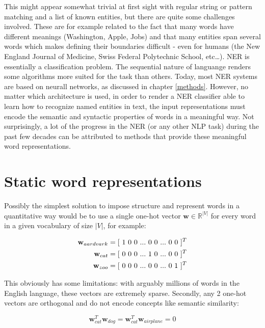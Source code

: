 \documentclass[12pt,a4paper,]{book}
\begin{document}
This might appear somewhat trivial at first sight with regular string or pattern matching and a list of known entities, but there are quite some challenges involved. These are for example related to the fact that many words have different meanings (Washington, Apple, Jobs) and that many entities span several words which makes defining their boundaries difficult - even for humans (the New England Journal of Medicine, Swiss Federal Polytechnic School, etc\ldots{}). NER is essentially a classification problem. The sequential nature of languange renders some algorithms more suited for the task than others. Today, most NER systems are based on neurall networks, as discussed in chapter \ref{methods}. However, no matter which architecture is used, in order to render a NER classifier able to learn how to recognize named entities in text, the input representations must encode the semantic and syntactic properties of words in a meaningful way. Not surprisingly, a lot of the progress in the NER (or any other NLP task) during the past few decades can be attributed to methods that provide these meaningful word representations.

\hypertarget{static-word-representations}{%
\section{Static word representations}\label{static-word-representations}}

Possibly the simplest solution to impose structure and represent words in a quantitative way would be to use a single one-hot vector \(\mathbf{w} \in \mathbb{R}^{|V|}\) for every word in a given vocabulary of size \(|V|\), for example:

\begin{align}
\mathbf{w}_{aardvark} = [\ 1\ 0\ 0\ ...\ 0\ 0\ ...\ 0\ 0\ ]^T \notag \\
\mathbf{w}_{cat} = [\ 0\ 0\ 0\ ...\ 1\ 0\ ...\ 0\ 0\ ]^T \notag \\
\mathbf{w}_{zoo} = [\ 0\ 0\ 0\ ...\ 0\ 0\ ...\ 0\ 1\ ]^T \notag 
\end{align}

This obviously has some limitations: with arguably millions of words in the English language, these vectors are extremely sparse. Secondly, any 2 one-hot vectors are orthogonal and do not encode concepts like semantic similarity:

\[
\mathbf{w}_{cat}^T \mathbf{w}_{dog} = \mathbf{w}_{cat}^T \mathbf{w}_{airplane} = 0
\]
\end{document}

